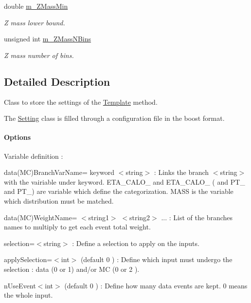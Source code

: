 \begin{DoxyCompactItemize}
double \hyperlink{classTemplateMethod_1_1Setting_aa944bcb3e1ccb277e165e48f2fd8a3e8}{m\+\_\+\+Z\+Mass\+Min}
\begin{DoxyCompactList}\small\item\em Z mass lower bound. \end{DoxyCompactList}\item 
unsigned int \hyperlink{classTemplateMethod_1_1Setting_a5173097d228f32cad8f0aacd5f8b19ae}{m\+\_\+\+Z\+Mass\+N\+Bins}
\begin{DoxyCompactList}\small\item\em Z mass number of bins. \end{DoxyCompactList}\end{DoxyCompactItemize}


\subsection{Detailed Description}
Class to store the settings of the \hyperlink{classTemplateMethod_1_1Template}{Template} method. 

The \hyperlink{classTemplateMethod_1_1Setting}{Setting} class is filled through a configuration file in the boost format.

\paragraph*{Options}

Variable definition \+:
\begin{DoxyItemize}
\item data(\+M\+C)Branch\+Var\+Name= keyword $<$string$>$ \+: Links the branch $<$string$>$ with the vairiable under keyword. E\+T\+A\+\_\+\+C\+A\+L\+O\+\_ and E\+T\+A\+\_\+\+C\+A\+L\+O\+\_ ( and P\+T\+\_ and P\+T\+\_) are variable which define the categorization. M\+A\+S\+S is the variable which distribution must be matched.
\item data(\+M\+C)Weight\+Name= $<$string1$>$ $<$string2$>$ ... \+: List of the branches names to multiply to get each event total weight.
\item selection=$<$string$>$ \+: Define a selection to apply on the inputs.
\item apply\+Selection=$<$int$>$ (default 0 ) \+: Define which input must undergo the selection \+: data (0 or 1) and/or M\+C (0 or 2 ).
\item n\+Use\+Event$<$int$>$ (default 0 ) \+: Define how many data events are kept. 0 means the whole input.
\end{DoxyItemize}

